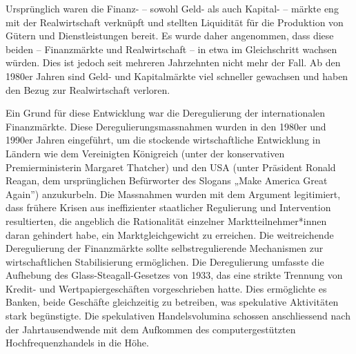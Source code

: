 \documentclass[
  nswissgerman,
  a4paper,
  DIV=11,
  numbers=noendperiod,
  oneside,
  openany]{scrreprt}
\begin{document}
Ursprünglich waren die Finanz- -- sowohl Geld- als auch Kapital- --
märkte eng mit der Realwirtschaft verknüpft und stellten Liquidität für
die Produktion von Gütern und Dienstleistungen bereit. Es wurde daher
angenommen, dass diese beiden -- Finanzmärkte und Realwirtschaft -- in
etwa im Gleichschritt wachsen würden. Dies ist jedoch seit mehreren
Jahrzehnten nicht mehr der Fall. Ab den 1980er Jahren sind Geld- und
Kapitalmärkte viel schneller gewachsen und haben den Bezug zur
Realwirtschaft verloren.

Ein Grund für diese Entwicklung war die Deregulierung der
internationalen Finanzmärkte. Diese Deregulierungsmassnahmen wurden in
den 1980er und 1990er Jahren eingeführt, um die stockende
wirtschaftliche Entwicklung in Ländern wie dem Vereinigten Königreich
(unter der konservativen Premierministerin Margaret Thatcher) und den
USA (unter Präsident Ronald Reagan, dem ursprünglichen Befürworter des
Slogans „Make America Great Again'') anzukurbeln. Die Massnahmen wurden
mit dem Argument legitimiert, dass frühere Krisen aus ineffizienter
staatlicher Regulierung und Intervention resultierten, die angeblich die
Rationalität einzelner Marktteilnehmer*innen daran gehindert habe, ein
Marktgleichgewicht zu erreichen. Die weitreichende Deregulierung der
Finanzmärkte sollte selbstregulierende Mechanismen zur wirtschaftlichen
Stabilisierung ermöglichen. Die Deregulierung umfasste die Aufhebung des
Glass-Steagall-Gesetzes von 1933, das eine strikte Trennung von Kredit-
und Wertpapiergeschäften vorgeschrieben hatte. Dies ermöglichte es
Banken, beide Geschäfte gleichzeitig zu betreiben, was spekulative
Aktivitäten stark begünstigte. Die spekulativen Handelsvolumina schossen
anschliessend nach der Jahrtausendwende mit dem Aufkommen des
computergestützten Hochfrequenzhandels in die Höhe.
\end{document}
